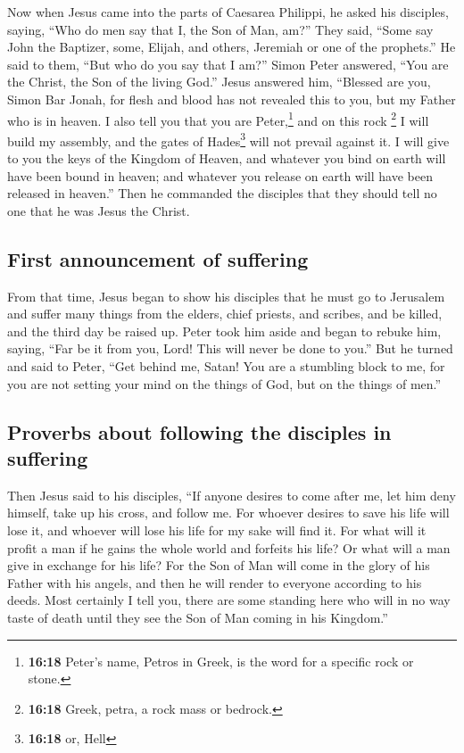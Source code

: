  Now when Jesus came into the parts of Caesarea Philippi,
he asked his disciples, saying, ``Who do men say that I, the Son of Man,
am?''  They said, ``Some say John the Baptizer, some,
Elijah, and others, Jeremiah or one of the prophets.'' 
He said to them, ``But who do you say that I am?''  Simon
Peter answered, ``You are the Christ, the Son of the living God.''
 Jesus answered him, ``Blessed are you, Simon Bar Jonah,
for flesh and blood has not revealed this to you, but my Father who is
in heaven.  I also tell you that you are
Peter,\footnote{\textbf{16:18} Peter's name, Petros in Greek, is the
  word for a specific rock or stone.} and on this rock \footnote{\textbf{16:18}
  Greek, petra, a rock mass or bedrock.} I will build my assembly, and
the gates of Hades\footnote{\textbf{16:18} or, Hell} will not prevail
against it.  I will give to you the keys of the Kingdom
of Heaven, and whatever you bind on earth will have been bound in
heaven; and whatever you release on earth will have been released in
heaven.''  Then he commanded the disciples that they
should tell no one that he was Jesus the Christ.

\hypertarget{first-announcement-of-suffering}{%
\subsection{First announcement of
suffering}\label{first-announcement-of-suffering}}

 From that time, Jesus began to show his disciples that
he must go to Jerusalem and suffer many things from the elders, chief
priests, and scribes, and be killed, and the third day be raised up.
 Peter took him aside and began to rebuke him, saying,
``Far be it from you, Lord! This will never be done to you.''
 But he turned and said to Peter, ``Get behind me, Satan!
You are a stumbling block to me, for you are not setting your mind on
the things of God, but on the things of men.''

\hypertarget{proverbs-about-following-the-disciples-in-suffering}{%
\subsection{Proverbs about following the disciples in
suffering}\label{proverbs-about-following-the-disciples-in-suffering}}

 Then Jesus said to his disciples, ``If anyone desires to
come after me, let him deny himself, take up his cross, and follow me.
 For whoever desires to save his life will lose it, and
whoever will lose his life for my sake will find it.  For
what will it profit a man if he gains the whole world and forfeits his
life? Or what will a man give in exchange for his life? 
For the Son of Man will come in the glory of his Father with his angels,
and then he will render to everyone according to his deeds.
 Most certainly I tell you, there are some standing here
who will in no way taste of death until they see the Son of Man coming
in his Kingdom.''

